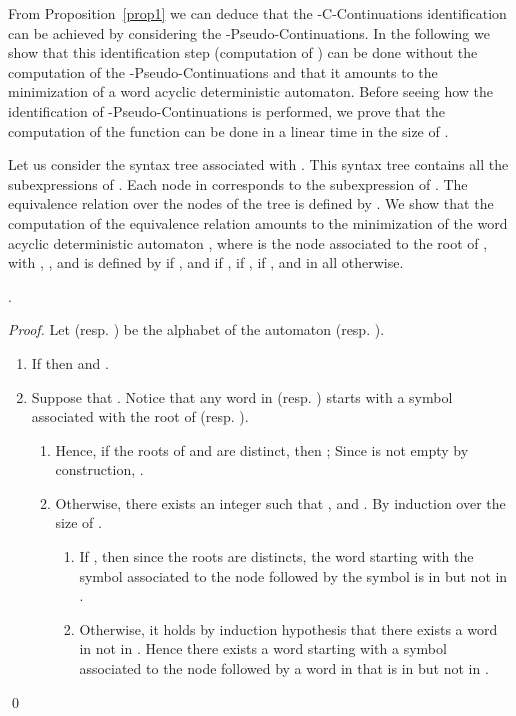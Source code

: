 \documentclass{llncs}
\begin{document}
  From Proposition~\ref{prop1} we can deduce that the -C-Continuations identification can be achieved by considering the -Pseudo-Continuations. In the following we show that this identification step (computation of ) can be done without the computation of the -Pseudo-Continuations and  that it amounts to the minimization of a word acyclic deterministic automaton. Before seeing how the identification of -Pseudo-Continuations  is performed, we prove that the computation of the function  can be done in a linear time in the size of . 

Let us consider the syntax tree  associated with 
.
 This syntax tree contains all the subexpressions of . Each node  in  corresponds to the 
subexpression  of . The equivalence relation  over the nodes of the tree  is defined by . We show that the computation of the equivalence relation  amounts to the minimization of the word acyclic deterministic automaton , where  is the node associated to the root of ,  with , , and  is defined by  if ,  and  if ,  if ,  if , and  in all otherwise. 

\begin{lemma}\label{lem exp egal si lang eq}
  .
\end{lemma} 
\begin{proof}
  Let  (resp. ) be the alphabet of the automaton  (resp. ).
  
  \begin{enumerate}
    \item If  then  and .
    \item Suppose that .  Notice that any word  in  (resp. ) starts with a symbol associated with the root of  (resp. ). 
    \begin{enumerate}
      \item Hence, if the roots of  and  are distinct, then  ; Since  is not empty by construction, . 
      \item Otherwise, there exists an integer  such that ,  and . By induction over the size of .
      \begin{enumerate}
        \item If , then since the roots are distincts, the word starting with the symbol associated to the node  followed by the symbol  is in  but not in .
        \item Otherwise, it holds by induction hypothesis that there exists a word in  not in . Hence there exists a word starting with a symbol associated to the node  followed by a word in  that is in  but not in .
      \end{enumerate}
    \end{enumerate}
  \end{enumerate}
  \qed
\end{proof}
\end{document}

